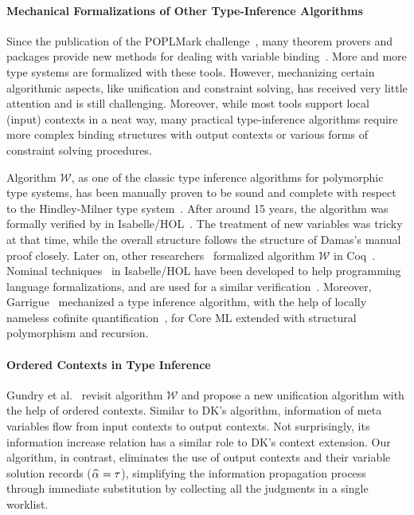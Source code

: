 \paragraph{Mechanical Formalizations of Other Type-Inference Algorithms}
Since the publication of the {\sc POPLMark} challenge~\cite{aydemir2005mechanized},
many theorem provers and packages provide new methods for dealing
with variable binding~\cite{aydemir2008engineering,urban2008nominalTech,chlipala2008parametric}.
More and more type systems are formalized with these tools.
However, mechanizing certain algorithmic aspects, like unification and
constraint solving, has received very little attention and is still challenging.
Moreover, while most tools support local (input) contexts in a neat way,
many practical type-inference algorithms require
more complex binding structures with output contexts or various forms of constraint solving procedures.

Algorithm $\mathcal{W}$,
as one of the classic type inference algorithms for polymorphic type systems,
has been manually proven to be sound and complete
with respect to the Hindley-Milner type system~\cite{hindley1969principal,milner1978theory,damas1982principal}.
After around 15 years, the algorithm was formally verified by
\citet{naraschewski1999type} in Isabelle/HOL~\cite{nipkow2002isabelle}.
The treatment of new variables was tricky at that time, while the overall structure follows the
structure of Damas's manual proof closely.
Later on, other researchers~\cite{dubois2000proving,dubois1999certification}
formalized algorithm $\mathcal{W}$ in Coq~\cite{Coq}.
Nominal techniques~\cite{urban2008nominalTech} in Isabelle/HOL have been
developed to help programming language formalizations, and are used for a similar
verification~\cite{urban2008nominal}. Moreover, Garrigue~\cite{garrigue2015certified}
mechanized a type inference algorithm,
with the help of locally nameless cofinite quantification~\cite{LocallyNameless},
for Core ML extended with structural polymorphism and recursion.

\paragraph{Ordered Contexts in Type Inference}
Gundry et al.~\cite{gundry2010type} revisit algorithm $\mathcal{W}$ and
propose a new unification algorithm with the help of ordered contexts.
Similar to DK's algorithm, information of meta variables flow from input contexts to output contexts.
Not surprisingly, its information increase relation has a similar role to DK's context extension.
Our algorithm, in contrast,
eliminates the use of output contexts and their variable solution records ($\al = \tau$),
simplifying the information propagation process through immediate substitution
by collecting all the judgments in a single worklist.

